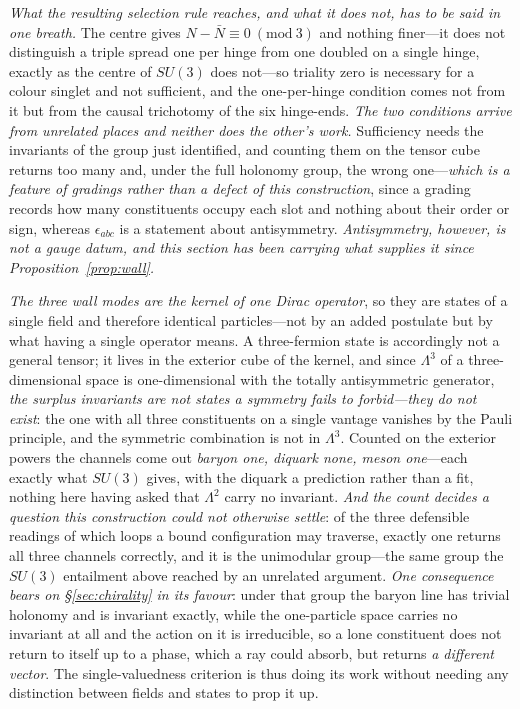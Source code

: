 \documentclass[11pt]{article}
\begin{document}
\emph{What the resulting selection rule reaches, and what it does not, has to be said in one
breath.} The centre gives $N-\bar N\equiv0\ (\mathrm{mod}\ 3)$ and nothing
finer---it does not distinguish a triple spread one per hinge from one doubled on a single hinge, exactly as
the centre of $SU(3)$ does not---so triality zero is necessary for a colour singlet and not sufficient, and the
one-per-hinge condition comes not from it but from the causal trichotomy of the six
hinge-ends. \emph{The two conditions arrive from unrelated places and neither
does the other's work.} Sufficiency needs the invariants of the group just identified, and counting them on the
tensor cube returns too many and, under the full holonomy group, the wrong one---\emph{which is a feature of
gradings rather than a defect of this construction}, since a grading records how many constituents occupy each
slot and nothing about their order or sign, whereas $\epsilon_{abc}$ is a statement about
antisymmetry. \emph{Antisymmetry, however, is not a gauge datum, and this
section has been carrying what supplies it since Proposition~\ref{prop:wall}.}

\emph{The three wall modes are the kernel of one Dirac operator}, so they are states of a single field and
therefore identical particles---not by an added postulate but by what having a single operator
means. A three-fermion state is accordingly not a general tensor; it lives in
the exterior cube of the kernel, and since $\Lambda^{3}$ of a three-dimensional space is one-dimensional with
the totally antisymmetric generator, \emph{the surplus invariants are not states a symmetry fails to
forbid---they do not exist}: the one with all three constituents on a single vantage vanishes by the Pauli
principle, and the symmetric combination is not in $\Lambda^{3}$. Counted on the exterior powers the channels
come out \emph{baryon one, diquark none, meson one}---each exactly what $SU(3)$ gives, with the diquark a
prediction rather than a fit, nothing here having asked that $\Lambda^{2}$ carry no invariant. \emph{And the
count decides a question this construction could not otherwise settle}: of the three defensible readings of
which loops a bound configuration may traverse, exactly one returns all three channels correctly, and it is the
unimodular group---the same group the $SU(3)$ entailment above reached by an unrelated argument. \emph{One
consequence bears on \S\ref{sec:chirality} in its favour}: under that group the baryon line has trivial
holonomy and is invariant exactly, while the one-particle space carries no invariant at all and the action on
it is irreducible, so a lone constituent does not return to itself up to a phase, which a ray could absorb, but
returns \emph{a different vector}. The single-valuedness criterion is thus doing its work without needing any
distinction between fields and states to prop it up.
\end{document}
